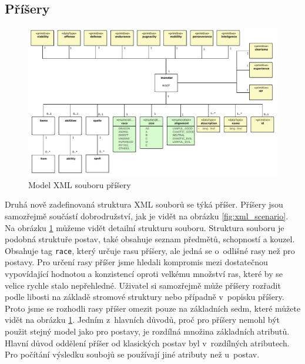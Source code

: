 \documentclass[thesis=B,czech]{resources/FITthesis}[2012/06/26]
\begin{document}
\subsection{Příšery}
\begin{figure}\centering
	\includegraphics[width=1\textwidth]{images/monsterXML}
	\caption[Model XML souboru příšery]{Model XML souboru příšery}\label{fig:xml_monster}
\end{figure}
Druhá nově zadefinovaná struktura XML souborů se týká příšer. Příšery jsou samozřejmě součástí dobrodružství, jak je vidět na obrázku \ref{fig:xml_scenario}. Na obrázku \ref{fig:xml_monster} můžeme vidět detailní strukturu souboru. Struktura souboru je podobná struktuře postav, také obsahuje seznam předmětů, schopností a kouzel. Obsahuje tag \texttt{race}, který určuje rasu příšery, ale jedná se o~odlišné rasy než pro postavy. Pro určení rasy příšer jsme hledali kompromis mezi dostatečnou vypovídající hodnotou a konzistencí oproti velkému množství ras, které by se velice rychle stalo nepřehledné. Uživatel si samozřejmě může příšery rozřadit podle libosti na základě stromové struktury nebo případně v~popisku příšery. Proto jsme se rozhodli rasy příšer omezit pouze na základních sedm, které můžete vidět na obrázku \ref{fig:xml_monster}. Jedním z~hlavních důvodů, proč pro příšery nemohl být použit stejný model jako pro postavy, je rozdílná množina základních atributů. Hlavní důvod oddělení příšer od klasických postav byl v~rozdílných atributech. Pro počítání výsledku soubojů se používají jiné atributy než u~postav. 
\end{document}
